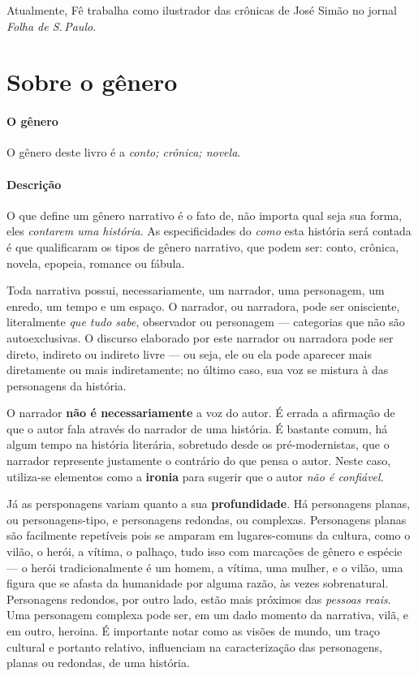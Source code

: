 \documentclass[11pt]{extarticle}
\begin{document}
Atualmente, Fê trabalha como ilustrador das crônicas de José Simão no jornal \textit{Folha de S.\,Paulo}.


\section{Sobre o gênero}

\paragraph{O gênero} O gênero deste livro é a \textit{conto; crônica; novela}. 

\paragraph{Descrição} O que define um gênero narrativo é o fato de, não importa
qual seja sua forma, eles \textit{contarem uma história}.
As especificidades do \textit{como} esta história será contada é que
qualificaram os tipos de gênero narrativo, que podem ser: conto, crônica, novela,
epopeia, romance ou fábula. 

Toda narrativa possui, necessariamente, um narrador, uma personagem, um enredo,
um tempo e um espaço. O narrador, ou narradora, pode ser onisciente, literalmente
\textit{que tudo sabe}, observador ou personagem --- categorias que não são autoexclusivas.
O discurso elaborado por este narrador ou narradora pode ser direto, indireto ou indireto livre 
--- ou seja, ele ou ela pode aparecer mais diretamente ou mais indiretamente; no último caso,
sua voz se mistura à das personagens da história.

O narrador \textbf{não é necessariamente} a voz do autor. É errada a afirmação
de que o autor fala através do narrador de uma história. É bastante comum,
há algum tempo na história literária, sobretudo desde os pré-modernistas, que 
o narrador represente justamente o contrário do que pensa o autor. Neste caso, 
utiliza-se elementos como a \textbf{ironia} para sugerir que o autor \textit{não é confiável}.

Já as persponagens variam quanto a sua \textbf{profundidade}. Há personagens planas, ou
personagens-tipo, e personagens redondas, ou complexas. Personagens planas
são facilmente repetíveis pois se amparam em lugares-comuns da cultura, como
o vilão, o herói, a vítima, o palhaço, tudo isso com marcações de gênero e espécie ---
o herói tradicionalmente é um homem, a vítima, uma mulher, e o vilão, uma figura que 
se afasta da humanidade por alguma razão, às vezes sobrenatural. 
Personagens redondos, por outro lado, estão mais próximos das \textit{pessoas reais}.
Uma personagem complexa pode ser, em um dado momento da narrativa, vilã, e em 
outro, heroina. É importante notar como as visões de mundo, um traço cultural e 
portanto relativo, influenciam na caracterização das personagens, planas 
ou redondas, de uma história.
\end{document}
